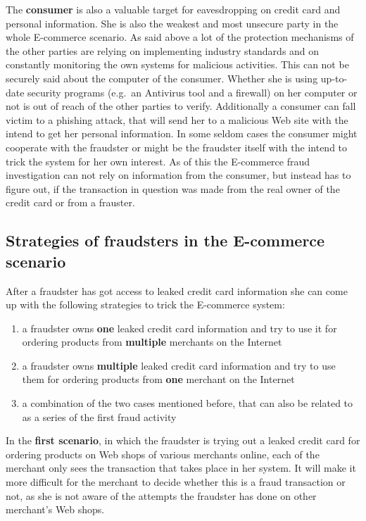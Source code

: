 The \textbf{consumer} is also a valuable target for eavesdropping on credit card and personal information. She is also the weakest and most unsecure party in the whole E-commerce scenario. As said above a lot of the protection mechanisms of the other parties are relying on implementing industry standards and on constantly monitoring the own systems for malicious activities. This can not be securely said about the computer of the consumer. Whether she is using up-to-date security programs (e.g.\ an Antivirus tool and a firewall) on her computer or not is out of reach of the other parties to verify. Additionally a consumer can fall victim to a phishing attack, that will send her to a malicious Web site with the intend to get her personal information. In some seldom cases the consumer might cooperate with the fraudster or might be the fraudster itself with the intend to trick the system for her own interest. As of this the E-commerce fraud investigation can not rely on information from the consumer, but instead has to figure out, if the transaction in question was made from the real owner of the credit card or from a frauster. \\


\subsection{Strategies of fraudsters in the E-commerce scenario}
\label{subsec:strategies_fraudster}

After a fraudster has got access to leaked credit card information she can come up with the following strategies to trick the E-commerce system:\@

\begin{enumerate}
  \item a fraudster owns \textbf{one} leaked credit card information and try to use it for ordering products from \textbf{multiple} merchants on the Internet
  \item a fraudster owns \textbf{multiple} leaked credit card information and try to use them for ordering products from \textbf{one} merchant on the Internet
  \item a combination of the two cases mentioned before, that can also be related to as a series of the first fraud activity
\end{enumerate}

In the \textbf{first scenario}, in which the fraudster is trying out a leaked credit card for ordering products on Web shops of various merchants online, each of the merchant only sees the transaction that takes place in her system. It will make it more difficult for the merchant to decide whether this is a fraud transaction or not, as she is not aware of the attempts the fraudster has done on other merchant's Web shops. \\

